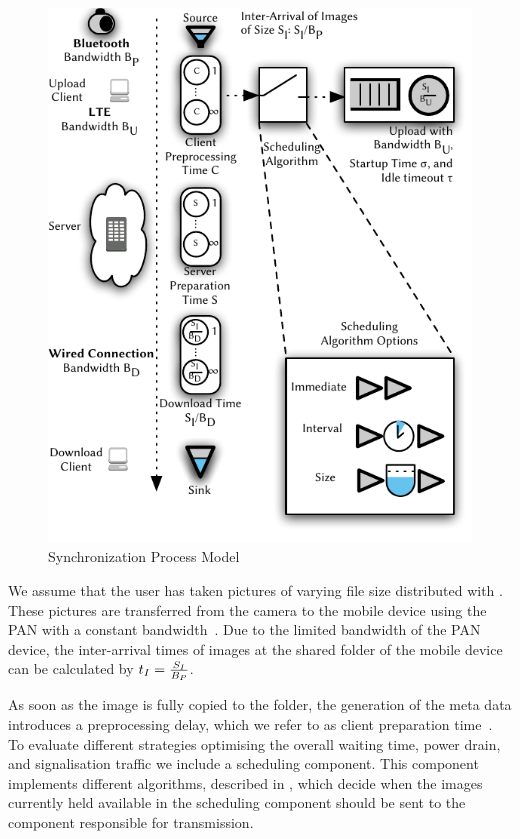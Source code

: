 \begin{figure}
\centering
\includegraphics[width=\columnwidth]{application/cloud_file_synchronization/system_model/figures/model}
\caption{Synchronization Process Model}
\label{fig:application:cloud_file_synchronisation:system_model:model_metrics:model}
\end{figure}

We assume that the user has taken pictures of varying file size distributed with \imageFileSize.
These pictures are transferred from the camera to the mobile device using the \gls{PAN} with a constant bandwidth~\panTransferRate.
Due to the limited bandwidth \panTransferRate of the \gls{PAN} device, the inter-arrival times of images at the \dropbox shared folder of the mobile device can be calculated by \(t_I = \frac{S_I}{B_{P}}\).

As soon as the image is fully copied to the \dropbox folder, the generation of the meta data introduces a preprocessing delay, which we refer to as client preparation time~\clientpreparationtime.
To evaluate different strategies optimising the overall waiting time, power drain, and signalisation traffic we include a scheduling component.
This component implements different algorithms, described in , which decide when the images currently held available in the scheduling component should be sent to the component responsible for transmission.

